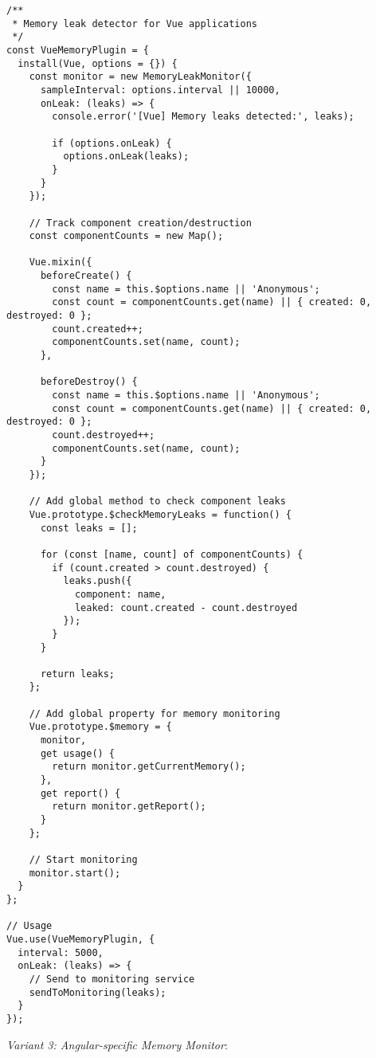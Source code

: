 \documentclass[11pt]{article}
\begin{document}
\begin{verbatim}
/**
 * Memory leak detector for Vue applications
 */
const VueMemoryPlugin = {
  install(Vue, options = {}) {
    const monitor = new MemoryLeakMonitor({
      sampleInterval: options.interval || 10000,
      onLeak: (leaks) => {
        console.error('[Vue] Memory leaks detected:', leaks);
        
        if (options.onLeak) {
          options.onLeak(leaks);
        }
      }
    });
    
    // Track component creation/destruction
    const componentCounts = new Map();
    
    Vue.mixin({
      beforeCreate() {
        const name = this.$options.name || 'Anonymous';
        const count = componentCounts.get(name) || { created: 0, destroyed: 0 };
        count.created++;
        componentCounts.set(name, count);
      },
      
      beforeDestroy() {
        const name = this.$options.name || 'Anonymous';
        const count = componentCounts.get(name) || { created: 0, destroyed: 0 };
        count.destroyed++;
        componentCounts.set(name, count);
      }
    });
    
    // Add global method to check component leaks
    Vue.prototype.$checkMemoryLeaks = function() {
      const leaks = [];
      
      for (const [name, count] of componentCounts) {
        if (count.created > count.destroyed) {
          leaks.push({
            component: name,
            leaked: count.created - count.destroyed
          });
        }
      }
      
      return leaks;
    };
    
    // Add global property for memory monitoring
    Vue.prototype.$memory = {
      monitor,
      get usage() {
        return monitor.getCurrentMemory();
      },
      get report() {
        return monitor.getReport();
      }
    };
    
    // Start monitoring
    monitor.start();
  }
};

// Usage
Vue.use(VueMemoryPlugin, {
  interval: 5000,
  onLeak: (leaks) => {
    // Send to monitoring service
    sendToMonitoring(leaks);
  }
});
\end{verbatim}

\emph{Variant 3: Angular-specific Memory Monitor}:
\end{document}
